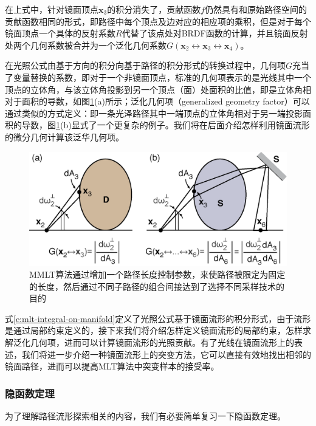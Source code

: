 \noindent 在上式中，针对镜面顶点$\mathbf{x}_3$的积分消失了，贡献函数$f$仍然具有和原始路径空间的贡献函数相同的形式，即路径中每个顶点及边对应的相应项的乘积，但是对于每个镜面顶点一个具体的反射系数$R$代替了该点处对BRDF函数的计算，并且镜面反射处两个几何系数被合并为一个泛化几何系数$G(\mathbf{x}_2\leftrightarrow\mathbf{x}_3\leftrightarrow\mathbf{x}_4)$。

在光照公式由基于方向的积分向基于路径的积分形式的转换过程中，几何项$G$充当了变量替换的系数，即对于一个非镜面顶点，标准的几何项表示的是光线其中一个顶点的立体角，与该立体角投影到另一个顶点（面）处面积的比值，即是立体角相对于面积的导数，如图\ref{f:mlt-generalized-geometry-factor}(a)所示；泛化几何项（generalized geometry factor）可以通过类似的方式定义：即一条光泽路径其中一端顶点的立体角相对于另一端投影面积的导数，图\ref{f:mlt-generalized-geometry-factor}(b)显式了一个更复杂的例子。我们将在后面介绍怎样利用镜面流形的微分几何计算该泛华几何项。

\begin{figure}
	\includegraphics[width=\textwidth]{figures/mlt/generalized-geometry-factor}
	\caption{MMLT算法通过增加一个路径长度控制参数，来使路径被限定为固定的长度，然后通过不同子路径的组合间接达到了选择不同采样技术的目的}
	\label{f:mlt-generalized-geometry-factor}
\end{figure}

式\ref{e:mlt-integral-on-manifold}定义了光照公式基于镜面流形的积分形式，由于流形是通过局部约束定义的，接下来我们将介绍怎样定义镜面流形的局部约束，怎样求解泛化几何项，进而可以计算镜面流形的光照贡献。有了光线在镜面流形上的表述，我们将进一步介绍一种镜面流形上的突变方法，它可以直接有效地找出相邻的镜面路径，进而可以提高MLT算法中突变样本的接受率。




\subsubsection{隐函数定理}\label{sec:mlt-implicit-function-throrem}
为了理解路径流形探索相关的内容，我们有必要简单复习一下隐函数定理。


